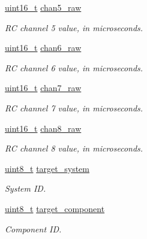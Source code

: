\begin{DoxyCompactItemize}
\hyperlink{stdint_8h_a273cf69d639a59973b6019625df33e30}{uint16\-\_\-t} \hyperlink{struct____mavlink__rc__channels__override__t_a97c62336395d208d02837ca92085f3ac}{chan5\-\_\-raw}
\begin{DoxyCompactList}\small\item\em R\-C channel 5 value, in microseconds. \end{DoxyCompactList}\item 
\hyperlink{stdint_8h_a273cf69d639a59973b6019625df33e30}{uint16\-\_\-t} \hyperlink{struct____mavlink__rc__channels__override__t_a8bef6b7819abe782e905da536c34b11d}{chan6\-\_\-raw}
\begin{DoxyCompactList}\small\item\em R\-C channel 6 value, in microseconds. \end{DoxyCompactList}\item 
\hyperlink{stdint_8h_a273cf69d639a59973b6019625df33e30}{uint16\-\_\-t} \hyperlink{struct____mavlink__rc__channels__override__t_a0380add4a72cd924a6ac61d1504dad82}{chan7\-\_\-raw}
\begin{DoxyCompactList}\small\item\em R\-C channel 7 value, in microseconds. \end{DoxyCompactList}\item 
\hyperlink{stdint_8h_a273cf69d639a59973b6019625df33e30}{uint16\-\_\-t} \hyperlink{struct____mavlink__rc__channels__override__t_a8028c42950c16d10f196f35df6d32404}{chan8\-\_\-raw}
\begin{DoxyCompactList}\small\item\em R\-C channel 8 value, in microseconds. \end{DoxyCompactList}\item 
\hyperlink{stdint_8h_aba7bc1797add20fe3efdf37ced1182c5}{uint8\-\_\-t} \hyperlink{struct____mavlink__rc__channels__override__t_a0c5393c94e6462a75244ad5083f310f8}{target\-\_\-system}
\begin{DoxyCompactList}\small\item\em System I\-D. \end{DoxyCompactList}\item 
\hyperlink{stdint_8h_aba7bc1797add20fe3efdf37ced1182c5}{uint8\-\_\-t} \hyperlink{struct____mavlink__rc__channels__override__t_af53aa3ccd48e674dd69ad102616b4045}{target\-\_\-component}
\begin{DoxyCompactList}\small\item\em Component I\-D. \end{DoxyCompactList}\end{DoxyCompactItemize}


